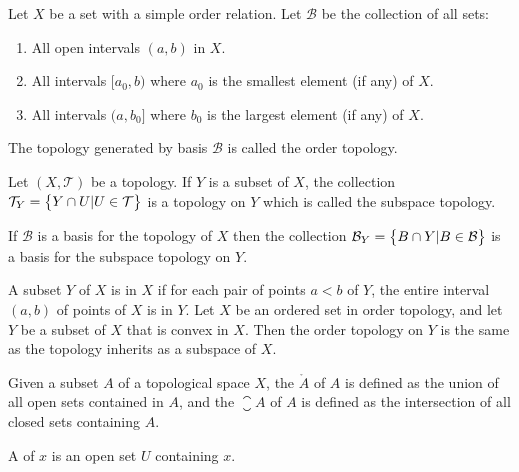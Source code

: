 \begin{definition}
    Let $X$ be a set with a simple order relation. Let $\mathcal{B}$ be the collection of all sets:
    \begin{enumerate}
        \item All open intervals $(a,b)$ in $X$.
        \item All intervals $[a_0, b)$ where $a_0$ is the smallest element (if any) of $X$.
        \item All intervals $(a, b_0]$ where $b_0$ is the largest element (if any) of $X$.
    \end{enumerate}
    The topology generated by basis $\mathcal{B}$ is called the order topology.
\end{definition}

\begin{definition}
    Let $(X, \mathcal{T})$ be a topology. If $Y$ is a subset of $X$, the collection $\mathcal{T}_{Y} = \set{Y \cap U | U \in \mathcal{T}}$ is a topology on $Y$ which is called the subspace topology.
\end{definition}

\begin{theorem}
    If $\mathcal{B}$ is a basis for the topology of $X$ then the collection $\mathcal{B}_Y = \set{B \cap Y | B \in \mathcal{B}}$ is a basis for the subspace topology on $Y$.
\end{theorem}

\begin{theorem}
    A subset $Y$ of $X$ is  in $X$ if for each pair of points $a < b$ of $Y$, the entire interval $(a,b)$ of points of $X$ is in $Y$. 
    Let $X$ be an ordered set in order topology, and let $Y$ be a subset of $X$ that is convex in $X$. Then the order topology on $Y$ is the same as the topology inherits as a subspace of $X$.
\end{theorem}

\begin{definition}
    Given a subset $A$ of a topological space $X$, the  $\mathring{A}$ of $A$ is defined as the union of all open sets contained in $A$, and the  $\closure{A}$ of $A$ is defined as the intersection of all closed sets containing $A$.
\end{definition}

\begin{definition}
    A  of $x$ is an open set $U$ containing $x$.
\end{definition}

